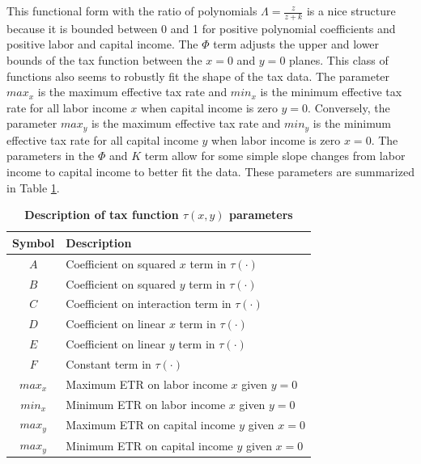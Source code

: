 \documentclass[letterpaper,12pt]{article}
\theoremstyle{definition}
\begin{document}
\begin{spacing}{1.5}
    This functional form with the ratio of polynomials $\Lambda = \frac{z}{z + k}$ is a nice structure because it is bounded between 0 and 1 for positive polynomial coefficients and positive labor and capital income. The $\Phi$ term adjusts the upper and lower bounds of the tax function between the $x=0$ and $y=0$ planes. This class of functions also seems to robustly fit the shape of the tax data. The parameter $max_x$ is the maximum effective tax rate and $min_x$ is the minimum effective tax rate for all labor income $x$ when capital income is zero $y=0$. Conversely, the parameter $max_y$ is the maximum effective tax rate and $min_y$ is the minimum effective tax rate for all capital income $y$ when labor income is zero $x=0$. The parameters in the $\Phi$ and $K$ term allow for some simple slope changes from labor income to capital income to better fit the data. These parameters are summarized in Table \ref{TabTaxParams}.

    \begin{table}[htbp] \centering \captionsetup{width=3.7in}
    \caption{\label{TabTaxParams}\textbf{Description of tax function $\tau(x,y)$ parameters}}
      \begin{threeparttable}
      \begin{tabular}{>{\footnotesize}c |>{\footnotesize}l }
        \hline\hline
        Symbol & \quad\quad\quad\quad Description  \\
        \hline
        $A$ & Coefficient on squared $x$ term in $\tau(\cdot)$  \\
        $B$ & Coefficient on squared $y$ term in $\tau(\cdot)$  \\
        $C$ & Coefficient on interaction term in $\tau(\cdot)$  \\
        $D$ & Coefficient on linear $x$ term in $\tau(\cdot)$  \\
        $E$ & Coefficient on linear $y$ term in $\tau(\cdot)$  \\
        $F$ & Constant term in $\tau(\cdot)$\\
        $max_x$ & Maximum ETR on labor income $x$ given $y=0$  \\
        $min_x$ & Minimum ETR on labor income $x$ given $y=0$ \\
        $max_y$ & Maximum ETR on capital income $y$ given $x=0$ \\
        $max_y$ & Minimum ETR on capital income $y$ given $x=0$ \\
        \hline\hline
      \end{tabular}
      \end{threeparttable}
    \end{table}


\end{spacing}
\end{document}
